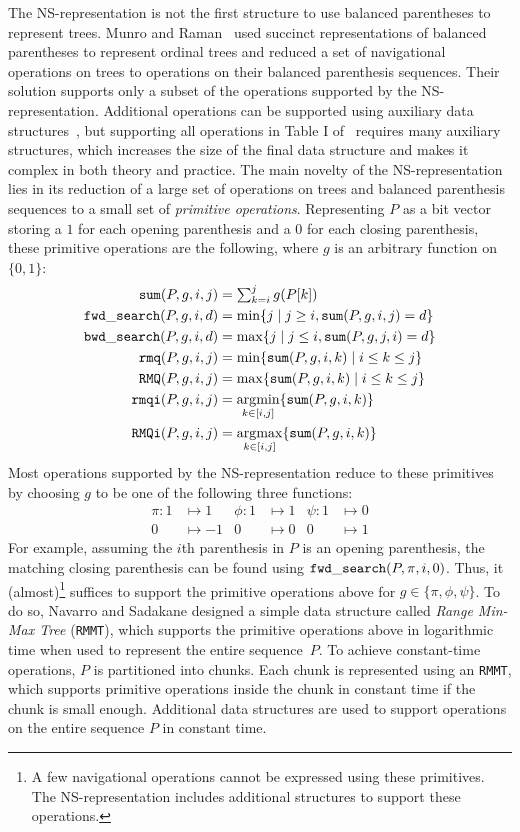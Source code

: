 The NS-representa\-tion is not the first structure to use balanced
parentheses to represent trees.  Munro and Raman~\cite{mr1997} used
succinct representations of balanced parentheses to represent ordinal trees
and reduced a set of navigational operations on trees to operations on their
balanced parenthesis sequences.  Their solution supports only a subset of the
operations supported by the NS-representation.  Additional operations
can be supported using auxiliary data structures~\cite{ly2008}, but
    supporting all operations in Table I of~\cite{Navarro:2014:FFS:2620785.2601073}
    requires many
auxiliary structures, which increases the size of the final data structure
and makes it complex in both theory and practice.  The main novelty of
the NS-representation lies in its reduction of a large set of
operations on trees and balanced parenthesis sequences to a small set
of \emph{primitive operations}.  Representing $P$ as a bit vector
storing a $1$ for each opening parenthesis and a $0$ for each closing
parenthesis, these primitive operations are the following, where $g$ is an
arbitrary function on $\{0,1\}$:
\begin{align*}
  \mathtt{sum}(P,g,i,j) &= \textstyle\sum_{k=i}^jg(P[k])\\
  \mathtt{fwd\_search}(P,g,i,d) &= \min\{j \mid j \ge i, \mathtt{sum}(P,g,i,j) = d\}\\
  \mathtt{bwd\_search}(P,g,i,d) &= \max\{j \mid j \le i, \mathtt{sum}(P,g,j,i) = d\}\\
  \mathtt{rmq}(P,g,i,j) &= \min\{\mathtt{sum}(P,g,i,k) \mid i\le k\le j\}\\
  \mathtt{RMQ}(P,g,i,j) &= \max\{\mathtt{sum}(P,g,i,k) \mid i\le k\le j\}\\
  \mathtt{rmqi}(P,g,i,j) &= \operatorname*{arg\!\min}_{k\in[i,j]}\{\mathtt{sum}(P,g,i,k)\}\\
  \mathtt{RMQi}(P,g,i,j) &= \operatorname*{arg\!\max}_{k\in[i,j]}\{\mathtt{sum}(P,g,i,k)\}
\end{align*}
Most operations supported by the NS-representation reduce to these primitives
by choosing $g$ to be one of the following three functions:
\begin{align*}
  \pi : 1 &\mapsto 1 &\phi : 1 &\mapsto 1 & \psi : 1 &\mapsto 0\\
  0 &\mapsto -1 & 0 &\mapsto 0 & 0 &\mapsto 1
\end{align*}
For example, assuming the $i$th parenthesis in $P$ is an opening parenthesis,
the matching closing parenthesis can be found using
$\mathtt{fwd\_search}(P,\pi,i,0)$.  Thus, it (almost)\footnote{A few
  navigational operations cannot be expressed using these primitives.
  The NS-representation includes additional structures to support
  these operations.} suffices to support the primitive operations above for
$g \in \{\pi, \phi, \psi\}$.  To do so, Navarro and Sadakane designed
a simple data structure called \emph{Range Min-Max Tree} ({\tt RMMT}),
which supports the primitive operations above in logarithmic time when used
to represent the entire sequence~$P$.  To achieve constant-time
operations, $P$ is partitioned into chunks.  Each chunk is represented
using an {\tt RMMT}, which supports primitive operations inside the
chunk in constant time if the chunk is small enough.  Additional data
structures are used to support operations on the entire sequence $P$
in constant time.

